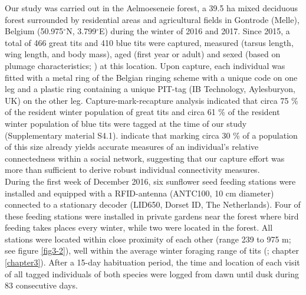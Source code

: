 \documentclass[10pt, twoside]{book} %
\begin{document}
Our study was carried out in the Aelmoeseneie forest, a 39.5 ha mixed deciduous forest surrounded by residential areas and agricultural fields in Gontrode (Melle), Belgium (50.975$^{\circ}$N, 3.799$^{\circ}$E) during the winter of 2016 and 2017. Since 2015, a total of 466 great tits and 410 blue tits were captured, measured (tarsus length, wing length, and body mass), aged (first year or adult) and sexed (based on plumage characteristics; \citealt{Svensson1992}) at this location. Upon capture, each individual was fitted with a metal ring of the Belgian ringing scheme with a unique code on one leg and a plastic ring containing a unique PIT-tag (IB Technology, Aylesburyon, UK) on the other leg. Capture-mark-recapture analysis indicated that circa 75 \% of the resident winter population of great tits and circa 61 \% of the resident winter population of blue tits were tagged at the time of our study (Supplementary material S4.1). \citet{Silk2015} indicate that marking circa 30 \% of a population of this size already yields accurate measures of an individual's relative connectedness within a social network, suggesting that our capture effort was more than sufficient to derive robust individual connectivity measures.\\

During the first week of December 2016, six sunflower seed feeding stations were installed and equipped with a RFID-antenna (ANTC100, 10 cm diameter) connected to a stationary decoder (LID650, Dorset ID, The Netherlands). Four of these feeding stations were installed in private gardens near the forest where bird feeding takes places every winter, while two were located in the forest. All stations were located within close proximity of each other (range 239 to 975 m; see figure \ref{fig3-2}), well within the average winter foraging range of tits (\citealt{Aplin2013}; chapter \ref{chapter3}). After a 15-day habituation period, the time and location of each visit of all tagged individuals of both species were logged from dawn until dusk during 83 consecutive days.\\
\end{document}
